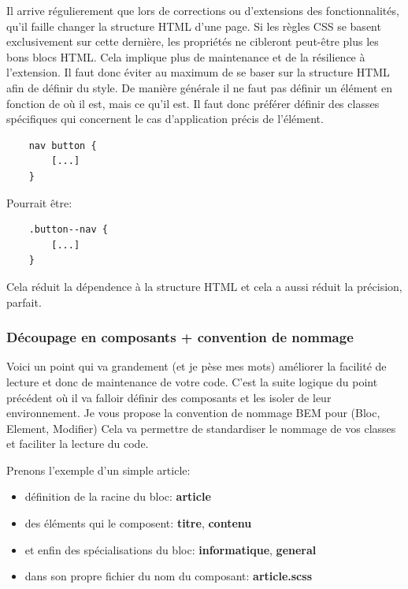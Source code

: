 \documentclass[12pt, a4paper]{report}
\begin{document}
Il arrive régulierement que lors de corrections ou d'extensions des fonctionnalités, qu'il faille changer la structure HTML d'une page.
Si les règles CSS se basent exclusivement sur cette dernière, les propriétés ne cibleront peut-être plus les bons blocs HTML.
Cela implique plus de maintenance et de la résilience à l'extension.
Il faut donc éviter au maximum de se baser sur la structure HTML afin de définir du style.
De manière générale il ne faut pas définir un élément en fonction de où il est, mais ce qu'il est.
Il faut donc préférer définir des classes spécifiques qui concernent le cas d'application précis de l'élément.

\begin{lstlisting}
    nav button {
        [...]
    }
\end{lstlisting}

Pourrait être:

\begin{lstlisting}
    .button--nav {
        [...]
    }
\end{lstlisting}

Cela réduit la dépendence à la structure HTML et cela a aussi réduit la précision, parfait.

\subsubsection{Découpage en composants + convention de nommage}

Voici un point qui va grandement (et je pèse mes mots) améliorer la facilité de lecture et donc de maintenance de votre code.
C'est la suite logique du point précédent où il va falloir définir des composants et les isoler de leur environnement.
Je vous propose la convention de nommage BEM pour (Bloc, Element, Modifier)
Cela va permettre de standardiser le nommage de vos classes et faciliter la lecture du code.

Prenons l'exemple d'un simple article:
\begin{itemize}
    \item définition de la racine du bloc: \textbf{article}
    \item des éléments qui le composent: \textbf{titre}, \textbf{contenu}
    \item et enfin des spécialisations du bloc: \textbf{informatique}, \textbf{general}
    \item dans son propre fichier du nom du composant: \textbf{\textunderscore article.scss}
\end{itemize}
\end{document}
